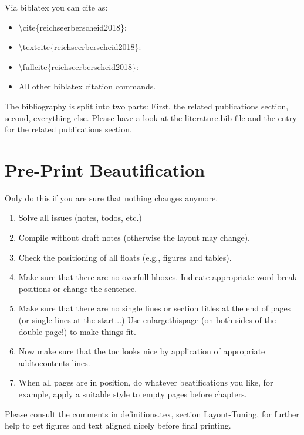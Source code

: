 Via biblatex you can cite as:

\begin{itemize}
  \item \textbackslash cite\{reichseerberscheid2018\}: \cite{reichseerberscheid2018}
  \item \textbackslash textcite\{reichseerberscheid2018\}: \textcite{reichseerberscheid2018}
  \item \textbackslash fullcite\{reichseerberscheid2018\}: 
  \item All other biblatex citation commands.
\end{itemize}

The bibliography is split into two parts: First, the related publications section, second, everything else.
Please have a look at the literature.bib file and the entry for the related publications section.


\section{Pre-Print Beautification}
\label{sec:pre-print-beaut}

Only do this if you are sure that nothing changes anymore.

\begin{enumerate}
\item Solve all issues (notes, todos, etc.)
\item Compile without draft notes (otherwise the layout may change).
\item Check the positioning of all floats (e.g., figures and tables).
\item Make sure that there are no overfull hboxes. Indicate appropriate word-break positions or change the sentence.
\item Make sure that there are no single lines or section titles at the end of pages (or single lines at the start...) Use enlargethispage (on both sides of the double page!) to make things fit.
\item Now make sure that the toc looks nice by application of appropriate addtocontents lines.
\item When all pages are in position, do whatever beatifications you like, for example, apply a suitable style to empty pages before chapters.
\end{enumerate}

Please consult the comments in definitions.tex, section Layout-Tuning, for further help to get figures and text aligned nicely before final printing.

\enlargethispage{4\baselineskip}


